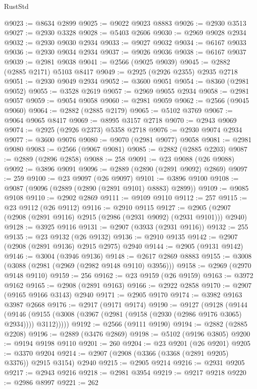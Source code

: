 \begin{lexlean}{RustStd}
\begin{coremodule}
@9023 := @8634 @2899
@9025 := @9022 @9023 @8883
@9026 := @2930 @3513
@9027 := @2930 @3328
@9028 := @5403 @2606
@9030 := @2969 @9028 @2934
@9032 := @2930 @9030 @2934
@9033 := @9027 @9032
@9034 := @6167 @9033
@9036 := @2930 @9034 @2934
@9037 := @9026 @9036
@9038 := @6167 @9037
@9039 := @2981 @9038
@9041 := @2566 (@9025 @9039)
@9045 := @2882 (@2885 @2171) @5103 @8417
@9049 := @2925 (@2926 @2355) @2935 @2718
@9051 := @2930 @9049 @2934
@9052 := @3600 @9051
@9054 := @8360 (@2981 @9052)
@9055 := @3528 @2619
@9057 := @2969 @9055 @2934
@9058 := @2981 @9057
@9059 := @9054 @9058
@9060 := @2981 @9059
@9062 := @2566 (@9045 @9060)
@9064 := @2882 (@2885 @2179)
@9065 := @5102 @3769
@9067 := @9064 @9065 @8417
@9069 := @8995 @3157 @2718
@9070 := @2943 @9069
@9074 := @2925 (@2926 @2373) @5358 @2718
@9076 := @2930 @9074 @2934
@9077 := @3600 @9076
@9080 := @9070 (@2981 @9077) @9058
@9081 := @2981 @9080
@9083 := @2566 (@9067 @9081)
@9085 := @2882 (@2885 @2203)
@9087 := @2889 (@2896 @2858)
@9088 := 258
@9091 := @23 @9088 (@26 @9088)
@9092 := @3896 @9091
@9096 := @2889 (@2890 (@2891 @9092) @2869)
@9097 := 259
@9100 := @23 @9097 (@26 @9097)
@9101 := @3896 @9100
@9108 := @9087 (@9096 (@2889 (@2890 (@2891 @9101) @8883) @2899))
@9109 := @9085 @9108
@9110 := @2902 @2869
@9111 := @9109 @9110
@9112 := 257
@9115 := @23 @9112 (@26 @9112)
@9116 := @2910 @9115
@9127 := @2905 (@2907 (@2908 (@2891 @9116) @2915 (@2986 (@2931 @9092) (@2931 @9101))) @2940)
@9128 := @3925 @9116
@9131 := @2907 (@3933 (@2931 @9116))
@9132 := 255
@9135 := @23 @9132 (@26 @9132)
@9136 := @2910 @9135
@9142 := @2907 (@2908 (@2891 @9136) @2915 @2975) @2940
@9144 := @2905 (@9131 @9142)
@9146 := @3004 (@3946 @9136)
@9148 := @2617 @2869 @8883
@9155 := @3008 (@3088 (@2981 (@2969 (@2982 @9148 @9110) @3956)))
@9158 := @2969 (@2970 @9148 @9110)
@9159 := 256
@9162 := @23 @9159 (@26 @9159)
@9163 := @3972 @9162
@9165 := @2908 (@2891 @9163)
@9166 := @2922 @2858
@9170 := @2907 (@9165 @9166 @3143) @2940
@9171 := @2905 @9170
@9174 := @3982 @9163 @3987 @2668
@9176 := @2917 (@9171 @9174)
@9190 := @9127
    (@9128
      (@9144
        (@9146 (@9155 (@3008 (@3967 (@2981 (@9158 (@2930 (@2986 @9176 @3065) @2934)))) @3112)))))
@9192 := @2566 (@9111 @9190)
@9194 := @2882 (@2885 @2208)
@9196 := @2889 (@3476 @2869)
@9198 := @5102 (@9196 @3805)
@9200 := @9194 @9198 @9110
@9201 := 260
@9204 := @23 @9201 (@26 @9201)
@9205 := @3370 @9204
@9214 := @2907 (@2908 (@3366 (@3368 (@2891 @9205) @3376)) @2915 @3154) @2940
@9215 := @2905 @9214
@9216 := @2931 @9205
@9217 := @2943 @9216
@9218 := @2981 @3954
@9219 := @9217 @9218
@9220 := @2986 @8997
@9221 := 262

\end{coremodule}
\end{lexlean}
